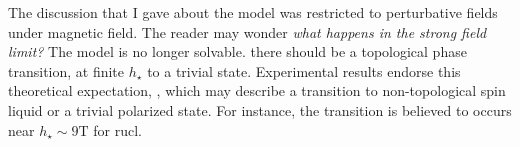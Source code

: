 The discussion that I gave about the model was restricted to perturbative fields under magnetic field. The reader may wonder \textit{what happens in the strong field limit?} The model is no longer solvable. there should be a topological phase transition, at finite $h_{\star}$ to a trivial state. Experimental results endorse this theoretical expectation, \cite{Kasahara_2018}, which may describe a transition to non-topological spin liquid or a trivial polarized state. For instance, the transition is believed to occurs near $h_{\star} \sim 9 \text{T}$ for \acrshort{rucl}.




